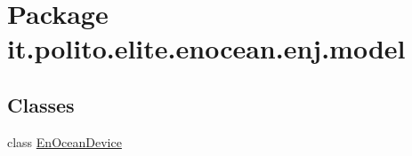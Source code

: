 \hypertarget{namespaceit_1_1polito_1_1elite_1_1enocean_1_1enj_1_1model}{}\section{Package it.\+polito.\+elite.\+enocean.\+enj.\+model}
\label{namespaceit_1_1polito_1_1elite_1_1enocean_1_1enj_1_1model}
\subsection*{Classes}
\begin{DoxyCompactItemize}
\item 
class \hyperlink{classit_1_1polito_1_1elite_1_1enocean_1_1enj_1_1model_1_1_en_ocean_device}{En\+Ocean\+Device}
\end{DoxyCompactItemize}

